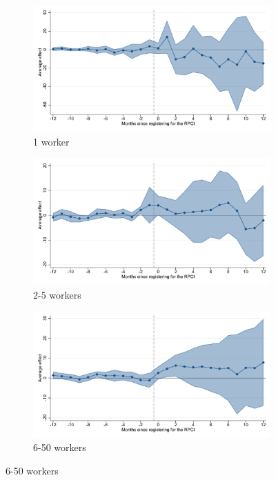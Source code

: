 \begin{figure}[H]
    \begin{subfigure}{0.32\textwidth}
    \caption{1 worker}
    \includegraphics[width=\textwidth]{04_Figures/muestra_10porciento/event_study_sal_formal_size_1_dcdh_connected.pdf}
    \end{subfigure}
    \begin{subfigure}{0.32\textwidth}
    \caption{2-5 workers}
    \includegraphics[width=\textwidth]{04_Figures/muestra_10porciento/event_study_sal_formal_size_2_dcdh_connected.pdf}
    \end{subfigure}
    \begin{subfigure}{0.32\textwidth}
    \caption{6-50 workers}
    \includegraphics[width=\textwidth]{04_Figures/muestra_10porciento/event_study_sal_formal_size_6_dcdh_connected.pdf}
    \end{subfigure}
    
\end{figure}

